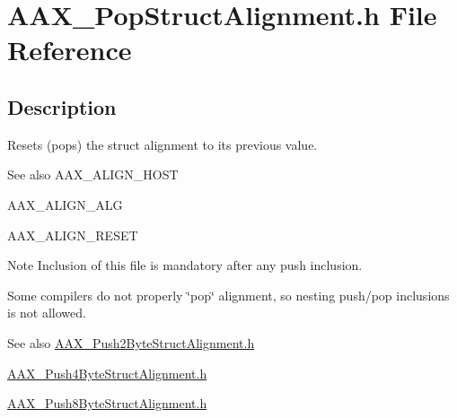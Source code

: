 \hypertarget{a00281}{}\section{A\+A\+X\+\_\+\+Pop\+Struct\+Alignment.\+h File Reference}
\label{a00281}


\subsection{Description}
Resets (pops) the struct alignment to its previous value. 

\begin{DoxySeeAlso}{See also}
A\+A\+X\+\_\+\+A\+L\+I\+G\+N\+\_\+\+H\+O\+S\+T 

A\+A\+X\+\_\+\+A\+L\+I\+G\+N\+\_\+\+A\+L\+G 

A\+A\+X\+\_\+\+A\+L\+I\+G\+N\+\_\+\+R\+E\+S\+E\+T
\end{DoxySeeAlso}
\begin{DoxyNote}{Note}
Inclusion of this file is mandatory after any \textquotesingle{}push\textquotesingle{} inclusion. 

Some compilers do not properly \char`\"{}pop\char`\"{} alignment, so nesting push/pop inclusions is not allowed.
\end{DoxyNote}
\begin{DoxySeeAlso}{See also}
\hyperlink{a00284}{A\+A\+X\+\_\+\+Push2\+Byte\+Struct\+Alignment.\+h} 

\hyperlink{a00285}{A\+A\+X\+\_\+\+Push4\+Byte\+Struct\+Alignment.\+h} 

\hyperlink{a00286}{A\+A\+X\+\_\+\+Push8\+Byte\+Struct\+Alignment.\+h}
\end{DoxySeeAlso}
